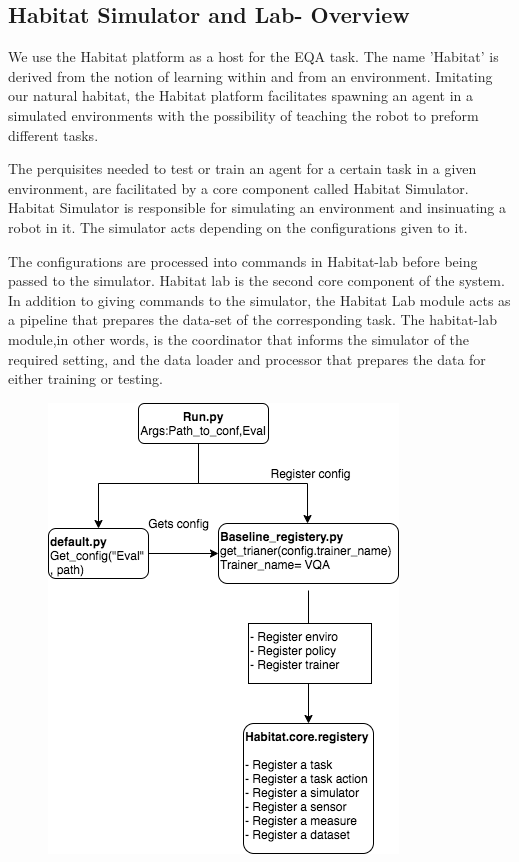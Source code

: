 \subsection{Habitat Simulator and Lab- Overview}

We use the Habitat platform as a host for the EQA task. The name 'Habitat' is derived from  the notion of learning within and from an environment. Imitating our natural habitat, the Habitat platform facilitates spawning an agent in a simulated environments with the possibility of teaching the robot to preform different tasks. 

The perquisites needed to test or train an agent for a certain task in a given environment, are facilitated by a core component called  Habitat Simulator. Habitat Simulator is responsible for simulating an  environment and insinuating a robot in it. The simulator acts depending on the configurations given to it. 

The configurations are processed into commands in Habitat-lab before being passed to the simulator. Habitat lab is the second core component of the system. In addition to giving commands to the simulator, the Habitat Lab module acts as a pipeline that prepares the data-set of the corresponding task. The habitat-lab module,in other words, is the coordinator that informs the simulator of the required setting, and the data loader and processor that prepares the data for either training or testing. 

\begin{figure}[H]
\includegraphics[scale=0.43]{images/configProcess.png}
\label{fig:configs}
\end{figure}


